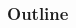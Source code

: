 

\begin{frame}
	\frametitle{Outline}
	\begin{columns}[t]
		\begin{column}{.35\textwidth}
			\tableofcontents[sections={1}]
		\end{column}
		\begin{column}{.325\textwidth}
			\tableofcontents[sections={2}]
		\end{column}
	\end{columns}
\end{frame}

